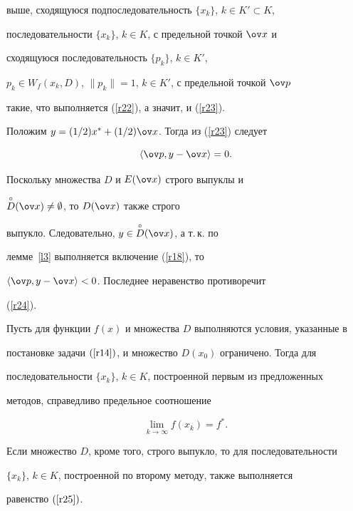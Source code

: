 \begin{pf}
выше, сходящуюся подпоследовательность $\{x_k\}$, $k\in K'\subset K$,


последовательности $\{x_k\}$, $k\in K$, с предельной точкой $\ov x$ и


сходящуюся последовательность $\{p_k\}$, $k\in K'$,


$p_k\in W_f(x_k, D)$, $\|p_k\|=1$, $k\in K'$, с предельной точкой $\ov p$


такие, что выполняется (\ref{r22}), а значит, и (\ref{r23}).


Положим $y=(1/2)x^* +(1/2)\ov x$. Тогда из (\ref{r23}) следует 




\begin{equation} \label{r24}


\la \ov p, y-\ov x \ra =0.


\end{equation}


%


Поскольку множества $D$ и $E(\ov x)$ строго выпуклы и


$\overset{\circ}{D}{}(\ov x)\ne \emptyset$, то $D(\ov x)$ также строго


выпукло. Следовательно, $y\in \overset{\circ}{D}{}(\ov x)$, а т.\,к. по


лемме~\ref{l3} выполняется включение (\ref{r18}), то


$\la \ov p, y-\ov x \ra <0$. Последнее неравенство противоречит


(\ref{r24}).


\end{pf}








\begin{thmnonum}\label{t1}


Пусть для функции $f(x)$ и множества $D$ выполняются условия, указанные в


постановке задачи $(\ref{r14})$, и множество $D(x_0)$ ограничено. Тогда для


последовательности $\{x_k\}$, $k\in K$, построенной первым из предложенных


методов, справедливо предельное соотношение




\begin{equation} \label{r25}


\lim \limits_{k\to \infty} f(x_k)=f^*.


\end{equation}


%


Если множество $D$, кроме того, строго выпукло, то для последовательности


$\{x_k\}$, $k\in K$, построенной по второму методу, также выполняется


равенство $(\ref{r25})$.


\end{thmnonum}





